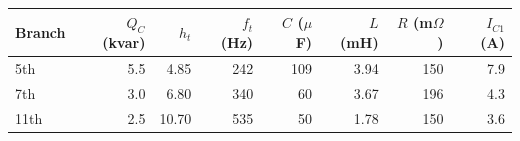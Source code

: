 \begin{tabular}{lrrrrrrr}
\toprule
Branch & $Q_C$ (kvar) & $h_t$ & $f_t$ (Hz) & $C$ ($\mu$F) & $L$ (mH) & $R$ (m$\Omega$) & $I_{C1}$ (A)\\
\midrule
5th & 5.5 & 4.85 & 242 & 109 & 3.94 & 150 & 7.9\\
7th & 3.0 & 6.80 & 340 & 60 & 3.67 & 196 & 4.3\\
11th & 2.5 & 10.70 & 535 & 50 & 1.78 & 150 & 3.6\\
\bottomrule
\end{tabular}
